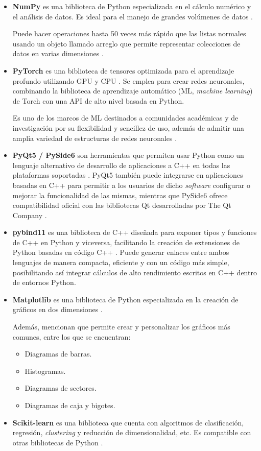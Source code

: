 \begin{itemize}
	\item\textbf{NumPy} es una biblioteca de Python especializada en el cálculo numérico y el análisis de datos. Es ideal para el manejo de grandes volúmenes de datos \cite{alfaro_numpy}.
	
	Puede hacer operaciones hasta 50 veces más rápido que las listas normales usando un objeto llamado arreglo que permite representar colecciones de datos en varias dimensiones \cite{alfaro_numpy}.
	
	\item\textbf{PyTorch} es una biblioteca de tensores optimizada para el aprendizaje profundo utilizando GPU y CPU \cite{pytorch_1}. Se emplea para crear redes neuronales, combinando la biblioteca de aprendizaje automático (ML, \textit{machine learning}) de Torch con una API de alto nivel basada en Python. 
	
	Es uno de los marcos de ML destinados a comunidades académicas y de investigación por su flexibilidad y sencillez de uso, además de admitir una amplia variedad de estructuras de redes neuronales \cite{pytorch_2}.
	
	\item \textbf{PyQt5 / PySide6} son herramientas que permiten usar Python como un lenguaje alternativo de desarrollo de aplicaciones a C++ en todas las plataformas soportadas \cite{qt_1}. PyQt5 también puede integrarse en aplicaciones basadas en C++ para permitir a los usuarios de dicho \textit{software} configurar o mejorar la funcionalidad de las mismas, mientras que PySide6 ofrece compatibilidad oficial con las bibliotecas Qt desarrolladas por The Qt Company \cite{qt_2}.
	
	\item \textbf{pybind11} es una biblioteca de C++ diseñada para exponer tipos y funciones de C++ en Python y viceversa, facilitando la creación de extensiones de Python basadas en código C++ \cite{pybind_pybind}. Puede generar enlaces entre ambos lenguajes de manera compacta, eficiente y con un código más simple, posibilitando así integrar cálculos de alto rendimiento escritos en C++ dentro de entornos Python.
	
	\item\textbf{Matplotlib} es una biblioteca de Python especializada en la creación de gráficos en dos dimensiones \cite{alferez_matplotlib}.
	
	Además, mencionan que permite crear y personalizar los gráficos más comunes, entre los que se encuentran:
	\begin{itemize}
		\item Diagramas de barras.
		\item Histogramas.
		\item Diagramas de sectores.
		\item Diagramas de caja y bigotes.
	\end{itemize}
	
	\item \textbf{Scikit-learn} es una biblioteca que cuenta con algoritmos de clasificación, regresión, \textit{clustering} y reducción de dimensionalidad, etc. Es compatible con otras bibliotecas de Python \cite{mds_scikitlearn}.
\end{itemize}

